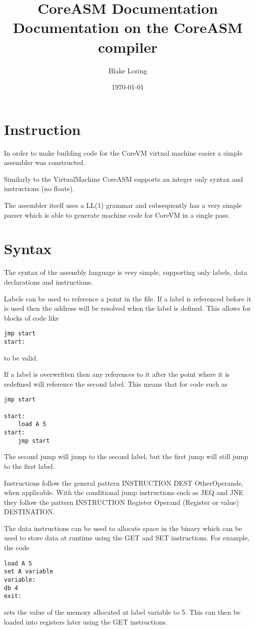 \documentclass{article}
\title{CoreASM Documentation \\ \large Documentation on the CoreASM compiler}
\author{Blake Loring}
\date{\today}
\begin{document}
\maketitle

\section* {Instruction}

In order to make building code for the CoreVM virtual machine easier a simple assembler was constructed.

Similarly to the VirtualMachine CoreASM supports an integer only syntax and instructions (no floats).

The assembler itself uses a LL(1) grammar and subsequently has a very simple parser which is able to generate machine code for CoreVM in a single pass. 

\section* {Syntax}

The syntax of the assembly language is very simple, supporting only labels, data declarations and instructions.

Labels can be used to reference a point in the file. If a label is referenced before it is used then the address will be resolved when the label is defined. This allows for blocks of code like
\begin {verbatim}
jmp start
start:
\end{verbatim}
to be valid.

If a label is overwritten then any references to it after the point where it is redefined will reference the second label. This means that for code such as
\begin{verbatim}
jmp start

start:
	load A 5
start:
	jmp start
\end{verbatim}
The second jump will jump to the second label, but the first jump will still jump to the first label.

Instructions follow the general pattern INSTRUCTION DEST OtherOperands, when applicable. With the conditional jump instructions
such as JEQ and JNE they follow the pattern INSTRUCTION Register Operand (Register or value) DESTINATION.

The data instructions can be used to allocate space in the binary which can be used to store data at runtime using the GET and SET instructions.
For example, the code
\begin {verbatim}
load A 5
set A variable
variable:
db 4
exit:
\end{verbatim}
sets the value of the memory allocated at label variable to 5. This can then be loaded into registers later using the GET instructions.
\end{document}
